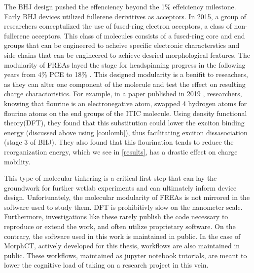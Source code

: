 The BHJ design pushed the effenciency beyond the 1\% effeiciency milestone. Early BHJ devices utilized
fullerene derivitives as acceptors. In 2015, a group of researchers conceptulized the use of
fused-ring electron acceptors, a class of non-fullerene acceptors. This class of molecules consists of
a fused-ring core and end groups that can be engineered to acheive specific electronic characterstics and side
chains that can be engineered to achieve desried morphological features. The modularity of FREAs
layed the stage for headspinning progress in the following years from 4\% PCE to 18\% \cite{Wang2021a}. 
This designed modularity is a benifit to reseachers, as they can alter one component of the molecule and test
the effect on resulting charge charactoristics. For example, in a paper published in 2019 \cite{Benatto2019},
researchers, knowing that flourine is an electronegative atom, swapped 4 hydrogen atoms for flourine atoms on
the end groups of the ITIC molecule. Using density functional theory(DFT), they found 
that this substitution could lower the exciton
binding energy (discussed above using \autoref{coulomb}), thus facilitating exciton dissasociation (stage 3 of
BHJ). They also found
that this flourination tends to reduce the reorganization energy, which we see in \autoref{results}, has a
drastic effect on charge mobility.

This type of molecular tinkering is a critical first step that can lay the groundwork for further wetlab
experiments and can ultimately inform device design. Unfortunately, the molecular modularity of FREAs is not
mirrored in the software used to study them. DFT is prohibitivly slow on the nanometer
scale. Furthermore, investigations like these rarely publish the code necessary to reproduce or extend the
work, and often utilize proprietary software. On the contrary, the software used in this 
work is maintained in public. In the
case of MorphCT, actively developed for this thesis, workflows are
also maintained in public. These workflows, maintained as jupyter notebook tutorials, 
are meant to lower the cognitive load of taking on a research project in this vein. 

